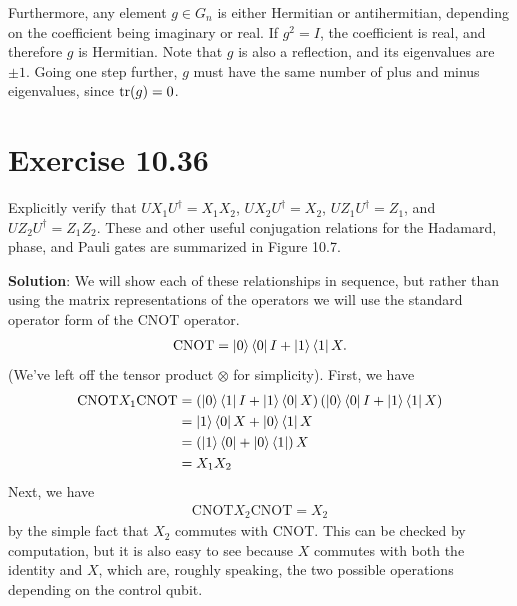\documentclass{book}
\begin{document}
    Furthermore, any element $g\in G_n$ is either Hermitian or antihermitian, depending on the coefficient being imaginary or real. If $g^2 = I$, the coefficient is real, and therefore $g$ is Hermitian. Note that $g$ is also a reflection, and its eigenvalues are $\pm 1$. Going one step further, $g$ must have the same number of plus and minus eigenvalues, since $\tr(g) = 0$.
    
\section*{Exercise 10.36}
    Explicitly verify that $U X_1 U^\dagger= X_1 X_2$, $U X_2 U^\dagger = X_2$, $U Z_1 U^\dagger = Z_1$, and $U Z_2 U^\dagger = Z_1 Z_2$. These and other useful conjugation relations for the Hadamard, phase, and Pauli gates are summarized in Figure 10.7.
    
    \textbf{Solution}: We will show each of these relationships in sequence, but rather than using the matrix representations of the operators we will use the standard operator form of the $\mathrm{CNOT}$ operator.
    \begin{align}
        \mathrm{CNOT} = \ket{0}\bra{0}I + \ket{1}\bra{1}X.
    \end{align} 
    (We've left off the tensor product $\otimes$ for simplicity).  First, we have
    \begin{align}
    \begin{aligned}
        \mathrm{CNOT}X_1 \mathrm{CNOT} &= \left(\ket{0}\bra{1}I  + \ket{1}\bra{0}X\right)\left(\ket{0}\bra{0}I + \ket{1}\bra{1} X\right) \\
        &=\ket{1}\bra{0} X + \ket{0}\bra{1}X \\
        &=\left(\ket{1}\bra{0}+\ket{0}\bra{1}\right) X \\
        &= X_1 X_2
    \end{aligned}
    \end{align}
    Next, we have
    \begin{align}
        \mathrm{CNOT} X_2 \mathrm{CNOT} = X_2
    \end{align}
    by the simple fact that $X_2$ commutes with $\mathrm{CNOT}$. This can be checked by computation, but it is also easy to see because $X$ commutes with both the identity and $X$, which are, roughly speaking, the two possible operations depending on the control qubit.
    
\end{document}
